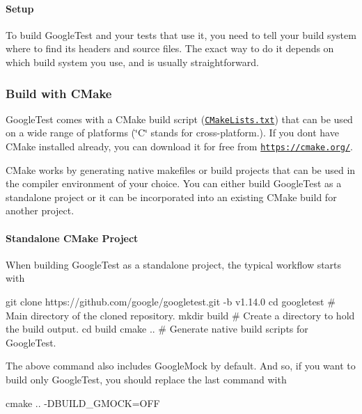 \paragraph*{Setup}

To build Google\+Test and your tests that use it, you need to tell your build system where to find its headers and source files. The exact way to do it depends on which build system you use, and is usually straightforward.

\subsubsection*{Build with C\+Make}

Google\+Test comes with a C\+Make build script (\href{https://github.com/google/googletest/blob/main/CMakeLists.txt}{\tt C\+Make\+Lists.\+txt}) that can be used on a wide range of platforms (\char`\"{}\+C\char`\"{} stands for cross-\/platform.). If you don\textquotesingle{}t have C\+Make installed already, you can download it for free from \href{https://cmake.org/}{\tt https\+://cmake.\+org/}.

C\+Make works by generating native makefiles or build projects that can be used in the compiler environment of your choice. You can either build Google\+Test as a standalone project or it can be incorporated into an existing C\+Make build for another project.

\paragraph*{Standalone C\+Make Project}

When building Google\+Test as a standalone project, the typical workflow starts with


\begin{DoxyCode}
git clone https://github.com/google/googletest.git -b v1.14.0
cd googletest        # Main directory of the cloned repository.
mkdir build          # Create a directory to hold the build output.
cd build
cmake ..             # Generate native build scripts for GoogleTest.
\end{DoxyCode}


The above command also includes Google\+Mock by default. And so, if you want to build only Google\+Test, you should replace the last command with


\begin{DoxyCode}
cmake .. -DBUILD\_GMOCK=OFF
\end{DoxyCode}


